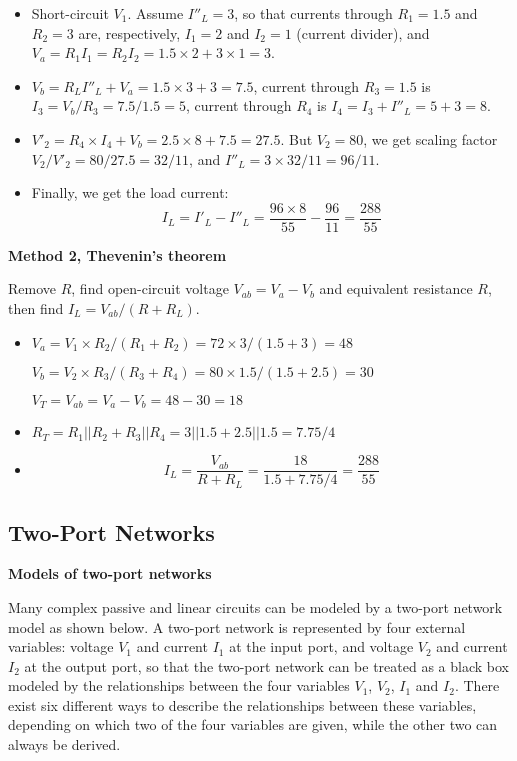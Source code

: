 \begin{itemize}
\begin{itemize}
\item Short-circuit $V_1$. Assume $I''_L=3$, so that currents through
	$R_1=1.5$ and $R_2=3$ are, respectively, $I_1=2$ and $I_2=1$
	(current divider), and $V_a=R_1I_1=R_2I_2=1.5\times 2+3\times 1=3$.
\item $V_b=R_L I''_L+V_a=1.5\times 3+3=7.5$, current through $R_3=1.5$
	is $I_3=V_b/R_3=7.5/1.5=5$, current through $R_4$ is 
	$I_4=I_3+I''_L=5+3=8$.
\item $V'_2=R_4\times I_4+V_b=2.5\times 8+7.5=27.5$. But $V_2=80$,
	we get scaling factor $V_2/V'_2=80/27.5=32/11$, and 
	$I''_L=3\times 32/11=96/11$.

\item Finally, we get the load current:
\[	I_L=I'_L-I''_L=\frac{96\times 8}{55}-\frac{96}{11}=\frac{288}{55} \]

\end{itemize}


{\bf Method 2, Thevenin's theorem}

Remove $R$, find open-circuit voltage $V_{ab}=V_a-V_b$ and equivalent
resistance $R$, then find $I_L=V_{ab}/(R+R_L)$.

\begin{itemize}
\item 
  $V_a=V_1\times R_2/(R_1+R_2)=72\times 3/(1.5+3)=48$

  $V_b=V_2\times R_3/(R_3+R_4)=80\times 1.5/(1.5+2.5)=30$

  $V_T=V_{ab}=V_a-V_b=48-30=18$
\item 
  $R_T=R_1 || R_2 + R_3 || R_4=3||1.5+2.5||1.5=7.75/4$
\item 
  \[ I_L=\frac{V_{ab}}{R+R_L}=\frac{18}{1.5+7.75/4}=\frac{288}{55} \]
\end{itemize}

\subsection*{Two-Port Networks}

{\bf Models of two-port networks}

Many complex passive and linear circuits can be modeled by a two-port network
model as shown below. A two-port network is represented by four external 
variables: voltage $V_1$ and current $I_1$ at the input port, and voltage 
$V_2$ and current $I_2$ at the output port, so that the two-port network 
can be treated as a black box modeled by the relationships between the 
four variables $V_1$, $V_2$, $I_1$ and $I_2$. There exist six different ways 
to describe the relationships between these variables, depending on which 
two of the four variables are given, while the other two can always be derived.


\end{itemize}
